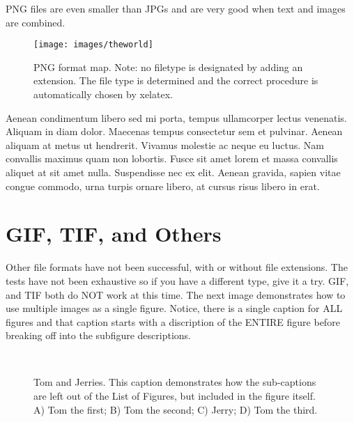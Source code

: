 PNG files are even smaller than JPGs and are very good when text and images are combined.

\begin{figure}[htbp]
  \centering
    \texttt{[image: images/theworld]}
    \caption[PNG format map. Note: no filetype is designated by adding an extension.]{PNG format map. Note: no filetype is designated by adding an extension. The file type is determined and the correct procedure is automatically chosen by xelatex.}
\end{figure}



Aenean condimentum libero sed mi porta, tempus ullamcorper lectus venenatis. Aliquam in diam dolor. Maecenas tempus consectetur sem et pulvinar. Aenean aliquam at metus ut hendrerit. Vivamus molestie ac neque eu luctus. Nam convallis maximus quam non lobortis. Fusce sit amet lorem et massa convallis aliquet at sit amet nulla. Suspendisse nec ex elit. Aenean gravida, sapien vitae congue commodo, urna turpis ornare libero, at cursus risus libero in erat. \cite{Rust94}

\section{GIF, TIF, and Others}

Other file formats have not been successful, with or without file extensions. The tests have not been exhaustive so if you have a different type, give it a try. GIF, and TIF both do NOT work at this time. The next image demonstrates how to use multiple images as a single figure. Notice, there is a single caption for ALL figures and that caption starts with a discription of the ENTIRE figure before breaking off into the subfigure descriptions.

\begin{figure}[htbp]
     \centering
   \mbox{
       \qquad
       \qquad
     }
    \mbox{
       \qquad
       \qquad
      }
    \caption[Tom and Jerry]{Tom and Jerries. This caption demonstrates how the sub-captions are left out of the List of Figures, but included in the figure itself. A) Tom the first; B) Tom the second; C) Jerry; D) Tom the third.}
    \label{mice}
  \end{figure}


